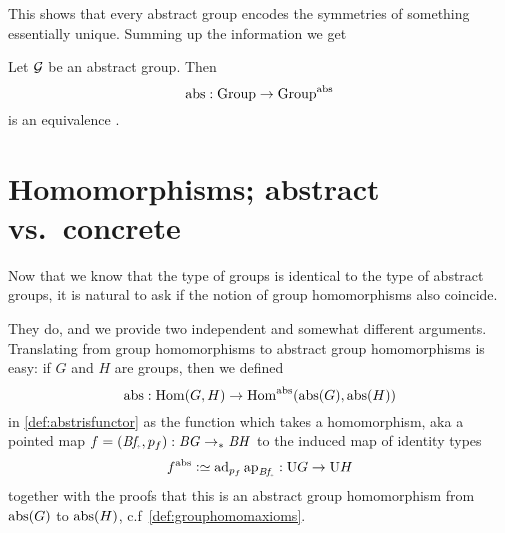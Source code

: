 This shows that every abstract group encodes the symmetries of something essentially unique.  Summing up the information we get
\begin{theorem}
  \label{lem:Groupsareidentitytypes}Let ${\mathcal G}$ be an abstract group.  
Then
$$\mathrm{abs}:\mathrm{Group}\to\mathrm{Group}^{\mathrm{abs}}$$ is an equivalence%
.
\end{theorem}

\section{Homomorphisms; abstract vs.~concrete}
\label{sec:homabsisconcr}

Now that we know that the type of groups is identical to the type of abstract groups, it is natural to ask if the notion of group homomorphisms also coincide.  

They do, and we provide two independent and somewhat different arguments.  Translating from group homomorphisms to abstract group homomorphisms is easy: if $G$ and $H$ are groups, then we defined 
$$\abstr:\Hom(G,H)\to\Hom^\abstr(\abstr(G),\abstr(H))$$
in \cref{def:abstrisfunctor} as the function which takes a homomorphism, aka a pointed map $f=(\Bf_\div,p_f):\BG\ptdto\BH$ to the induced map of identity types 
$$f^\abstr\defequi \mathrm{ad}_{p_f}\ap{\Bf_\div}:\USym G\to\USym H$$
 together with the proofs that this is an abstract group homomorphism from $\mathrm{abs}(G)$ to $\mathrm{abs}(H)$, c.f~\cref{def:grouphomomaxioms}.


